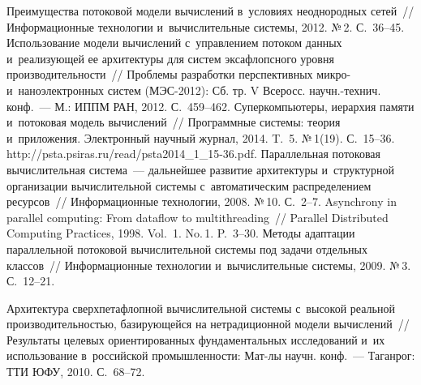 \begin{multicols}{2}
{\small\frenchspacing
 {%
 \begin{thebibliography}{99}
   Преимущества потоковой 
модели вычислений в~условиях неоднородных сетей~// Информационные 
технологии и~вычислительные системы, 2012. №\,2. С.~36--45.
   Использование 
модели вычислений с~управлением потоком данных и~реализующей ее 
архитектуры для сис\-тем эксафлопсного уровня производительности~// 
Проблемы разработки перспективных микро- и~наноэлектронных сис\-тем 
(МЭС-2012): Сб. тр. V Всеросс. научн.-технич. конф.~--- М.: ИППМ РАН, 
2012. С.~459--462.
Суперкомпьютеры, иерархия памяти и~потоковая модель вычислений~// 
Программные системы: теория и~приложения. Электронный научный журнал, 
2014. T.~5. №\,1(19). С.~15--36. {\sf http://psta.psiras.ru/read/psta2014\_1\_15-36.pdf}.
Параллельная потоковая вычислительная система~--- дальнейшее развитие 
архитектуры и~структурной организации вычислительной системы 
с~автоматическим распределением ресурсов~// Информационные технологии, 
2008. №\,10. С.~2--7.
   Asynchrony in parallel computing: From 
dataflow to multithreading~// Parallel Distributed Computing Practices, 1998. 
Vol.~1. No.\,1. P.~3--30.
Методы адаптации параллельной потоковой вычислительной системы под 
задачи отдельных классов~// Информационные технологии и~вычислительные 
системы, 2009. №\,3. С.~12--21.

   Архитектура 
сверхпетафлопной вычислительной системы с~высокой реальной 
производительностью, бази\-ру\-ющей\-ся на нетрадиционной модели 
вычислений~// Результаты целевых ориентированных фундаментальных 
исследований и~их использование в~российской промышленности: Мат-лы 
научн. конф.~--- Таганрог: ТТИ ЮФУ, 2010. С.~68--72.


\end{thebibliography}}}
\end{multicols}
